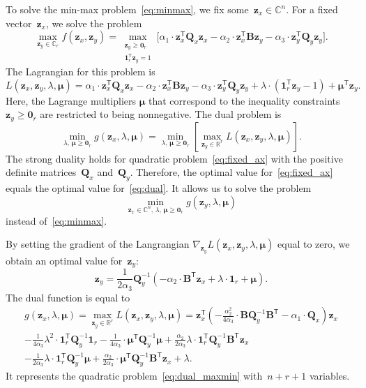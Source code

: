 \documentclass[12pt,twoside]{article}
\theoremstyle{definition}
\newcommand{\bz}{\mathbf{z}}
\newcommand{\bB}{\mathbf{B}}
\newcommand{\bQ}{\mathbf{Q}}
\newcommand{\bbR}{\mathbb{R}}
\newcommand{\T}{\mathsf{T}}
\newcommand{\bmu}{\boldsymbol{\mu}}
\newcommand{\bOne}{\boldsymbol{1}}
\newcommand{\bZero}{\boldsymbol{0}}
\begin{document}
To solve the min-max problem~\eqref{eq:minmax}, we fix some~$\bz_x \in \mathbb{C}^n$. For a fixed vector~$\bz_x$, we solve the problem
\begin{equation}
\max_{\bz_y \in \mathbb{C}_r} f(\bz_x, \bz_y) = \max_{\substack{\bz_y \geq \bZero_r \\ \bOne_r^{\T}\bz_y=1}} \bigl[\alpha_1 \cdot \bz_x^{\T} \bQ_x \bz_x - \alpha_2 \cdot \bz_x^{\T} \bB \bz_y - \alpha_3 \cdot \bz_y^{\T} \bQ_y \bz_y \bigr].
\label{eq:fixed_ax}
\end{equation}
The Lagrangian for this problem is
\begin{equation*}
L(\bz_x, \bz_y, \lambda, \bmu) = \alpha_1 \cdot \bz_x^{\T} \bQ_x \bz_x - \alpha_2 \cdot \bz_x^{\T} \bB \bz_y - \alpha_3 \cdot \bz_y^{\T} \bQ_y \bz_y + \lambda \cdot  (\bOne_r^{\T} \bz_y - 1) + \bmu^{\T} \bz_y.
\end{equation*}
Here, the Lagrange multipliers $\bmu$ that correspond to the inequality constraints $\bz_y \geq \bZero_r$ are restricted to being nonnegative.
The dual problem is
\begin{equation}
\min_{\lambda, \, \bmu \geq \bZero_r} g(\bz_x, \lambda, \bmu) = \min_{\lambda, \, \bmu \geq \bZero_r}  \left[\max_{\bz_y \in \bbR^r} L(\bz_x, \bz_y, \lambda, \bmu) \right].
\label{eq:dual}
\end{equation}
The strong duality holds for quadratic problem~\eqref{eq:fixed_ax} with the positive definite matrices~$\bQ_x$ and~$\bQ_y$. Therefore, the optimal value for~\eqref{eq:fixed_ax} equals the optimal value for~\eqref{eq:dual}. It allows us to solve the problem
\begin{equation}
\min_{\bz_x \in \mathbb{C}^n, \, \lambda, \, \bmu \geq \bZero_r} g(\bz_y, \lambda, \bmu)
\label{eq:dual_maxmin}
\end{equation}
instead of~\eqref{eq:minmax}.

By setting the gradient of the Langrangian $\nabla_{\bz_y} L(\bz_x, \bz_y, \lambda, \bmu)$ equal to zero, we obtain an optimal value for~$\bz_y$:
\begin{equation}
\bz_y = \frac{1}{2\alpha_3} \bQ_y^{-1} \left( - \alpha_2 \cdot \bB^{\T} \bz_x +\lambda \cdot \bOne_r + \bmu \right).
\label{eq:ax}
\end{equation}
The dual function is equal to
\begin{multline}
g(\bz_x, \lambda, \bmu)
= \max_{\bz_y \in \bbR^r} L(\bz_x, \bz_y, \lambda, \bmu) =
\bz_x^{\T} \left( - \frac{\alpha_2^2}{4\alpha_3} \cdot \bB \bQ_y^{-1} \bB^{\T} - \alpha_1 \cdot \bQ_x\right) \bz_x \\ - \frac{1}{4 \alpha_3} \lambda^2 \cdot \bOne_r^{\T} \bQ_y^{-1} \bOne_r - \frac{1}{4 \alpha_3} \cdot \bmu^{\T} \bQ_y^{-1} \bmu + \frac{\alpha_2}{2 \alpha_3} \lambda \cdot \bOne_r^{\T} \bQ_y^{-1} \bB^{\T} \bz_x \\ - \frac{1}{2 \alpha_3} \lambda \cdot \bOne_r^{\T} \bQ_y^{-1} \bmu + \frac{\alpha_2}{2 \alpha_3} \cdot \bmu^{\T} \bQ_y^{-1} \bB^{\T} \bz_x + \lambda.
\label{eq:dual_quadratic_form}
\end{multline}
It represents the quadratic problem~\eqref{eq:dual_maxmin} with~$n + r + 1$ variables.
\end{document}

